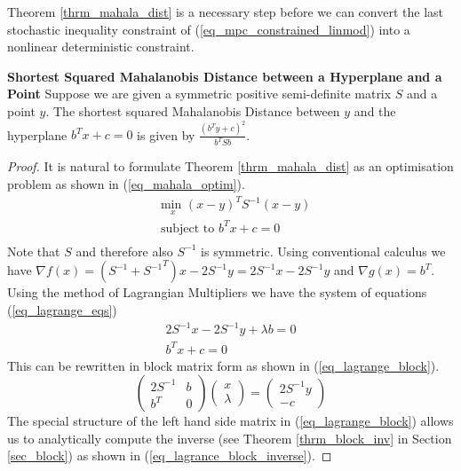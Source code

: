 Theorem \ref{thrm_mahala_dist} is a necessary step before we can convert the last stochastic inequality constraint of (\ref{eq_mpc_constrained_linmod}) into a nonlinear deterministic constraint.
\begin{thrm}
\textbf{Shortest Squared Mahalanobis Distance between a Hyperplane and a Point} Suppose we are given a symmetric positive semi-definite matrix $S$ and a point $y$. The shortest squared Mahalanobis Distance between $y$ and the hyperplane $b^Tx+c=0$ is given by $\frac{(b^Ty+c)^2}{b^TSb}$.
\label{thrm_mahala_dist}
\end{thrm}
\begin{proof}
It is natural to formulate Theorem \ref{thrm_mahala_dist} as an optimisation problem as shown in (\ref{eq_mahala_optim}). \begin{equation}
\begin{aligned}
&\underset{x}{\text{min }} (x-y)^TS^{-1}(x-y)\\
& \text{subject to } b^Tx+c = 0\\
\end{aligned}
\label{eq_mahala_optim}
\end{equation}
Note that $S$ and therefore also $S^{-1}$ is symmetric. Using conventional calculus we have $\nabla f(x) = (S^{-1} + {S^{-1}}^T)x - 2S^{-1}y = 2S^{-1}x - 2S^{-1}y$ and $\nabla g(x) = b^T$. Using the method of Lagrangian Multipliers \cite{forst} we have the system of equations (\ref{eq_lagrange_eqs})
\begin{equation}
\begin{aligned}
2S^{-1}x - 2S^{-1}y + \lambda b = 0 \\
b^Tx+c = 0
\end{aligned}
\label{eq_lagrange_eqs}
\end{equation}
This can be rewritten in block matrix form as shown in (\ref{eq_lagrange_block}).
\begin{equation}
\begin{pmatrix}
2S^{-1} & b \\ b^T & 0
\end{pmatrix} \begin{pmatrix}
x \\ \lambda
\end{pmatrix} = \begin{pmatrix}
2S^{-1}y \\ -c
\end{pmatrix}
\label{eq_lagrange_block}
\end{equation}
The special structure of the left hand side matrix in (\ref{eq_lagrange_block}) allows us to analytically compute the inverse (see Theorem \ref{thrm_block_inv} in Section \ref{sec_block}) as shown in (\ref{eq_lagrance_block_inverse}).

\end{proof}

